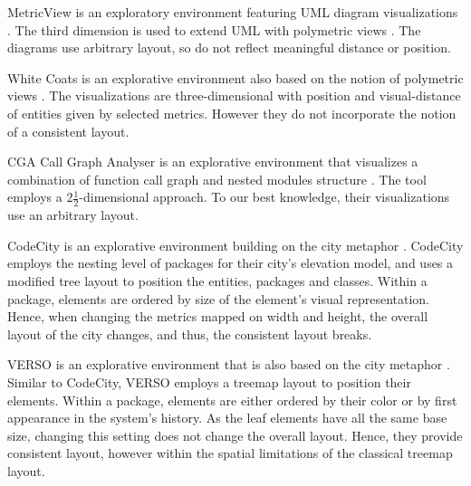 MetricView is an exploratory environment featuring UML diagram visualizations \cite{Term05a}. The third dimension is used to extend UML with polymetric views \cite{Lanz03d}.
The diagrams use arbitrary layout, so do not reflect meaningful distance or position.

White Coats is an explorative environment also based on the notion of polymetric views \cite{Mesn05b}. The visualizations are three-dimensional with position and visual-distance of entities given by selected metrics. However they do not incorporate the notion of a consistent layout.

CGA Call Graph Analyser is an explorative environment that visualizes a combination of function call graph and nested modules structure \cite{Bohn07a}. The tool employs a 2$\frac{1}{2}$-dimensional approach. To our best knowledge, their visualizations use an arbitrary layout.

CodeCity is an explorative environment building on the city metaphor \cite{Wett07b}. CodeCity employs the nesting level of packages for their city's elevation model, and uses a modified tree layout to position the entities, \ie packages and classes. Within a package, elements are ordered by size of the element's visual representation. Hence, when changing the metrics mapped on width and height, the overall layout of the city changes, and thus, the consistent layout breaks.

VERSO is an explorative environment that is also based on the city metaphor \cite{Lang05a}. Similar to CodeCity, VERSO employs a treemap layout to position their elements. Within a package, elements are either ordered by their color or by first appearance in the system's history. As the leaf elements have all the same base size, changing this setting does not change the overall layout. Hence, they provide consistent layout, however within the spatial limitations of the classical treemap layout. 
